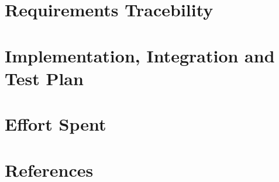 \documentclass{article}
\begin{document}
\section{Requirements Tracebility}

\section{Implementation, Integration and Test Plan}

\section{Effort Spent}

\section{References}
\end{document}
